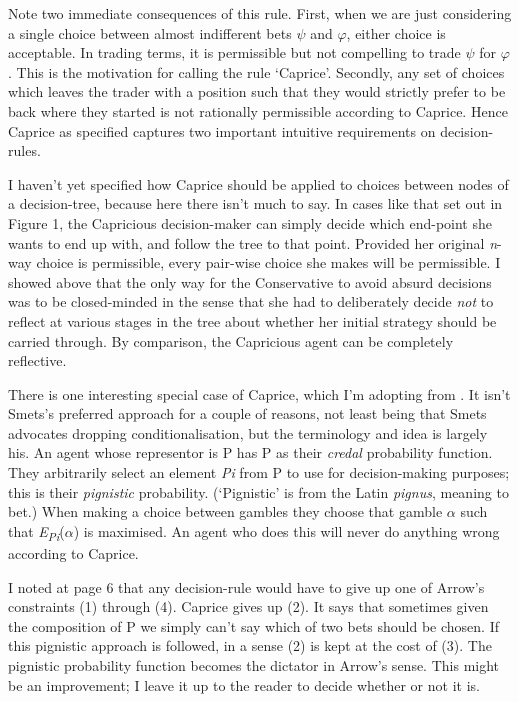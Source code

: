 Note two immediate consequences of this rule. First, when we are just
considering a single choice between almost indifferent bets $\psi$ and $\varphi$,
either choice is acceptable. In trading terms, it is permissible but not
compelling to trade $\psi$ for $\varphi$. This is the motivation for calling the rule
`Caprice'. Secondly, any set of choices which leaves the trader with a
position such that they would strictly prefer to be back where they
started is not rationally permissible according to Caprice. Hence
Caprice as specified captures two important intuitive requirements on
decision-rules.

I haven't yet specified how Caprice should be applied to choices between
nodes of a decision-tree, because here there isn't much to say. In cases
like that set out in Figure 1, the Capricious decision-maker can simply
decide which end-point she wants to end up with, and follow the tree to
that point. Provided her original \emph{n}-way choice is permissible,
every pair-wise choice she makes will be permissible. I showed above
that the only way for the Conservative to avoid absurd decisions was to
be closed-minded in the sense that she had to deliberately decide
\emph{not} to reflect at various stages in the tree about whether her
initial strategy should be carried through. By comparison, the
Capricious agent can be completely reflective.

There is one interesting special case of Caprice, which I'm adopting
from \citet{Smets1994}. It isn't Smets's preferred approach for a couple of
reasons, not least being that Smets advocates dropping
conditionalisation, but the terminology and idea is largely his. An
agent whose representor is P has P as their \emph{credal} probability
function. They arbitrarily select an element \emph{Pi} from P to use for
decision-making purposes; this is their \emph{pignistic} probability.
(`Pignistic' is from the Latin \emph{pignus}, meaning to bet.) When
making a choice between gambles they choose that gamble $\alpha$ such that
\emph{E\textsubscript{Pi}}($\alpha$) is maximised. An agent who does this will
never do anything wrong according to Caprice.

I noted at page 6 that any decision-rule would have to give up one of
Arrow's constraints (1) through (4). Caprice gives up (2). It says that
sometimes given the composition of P we simply can't say which of two
bets should be chosen. If this pignistic approach is followed, in a
sense (2) is kept at the cost of (3). The pignistic probability function
becomes the dictator in Arrow's sense. This might be an improvement; I
leave it up to the reader to decide whether or not it is.

